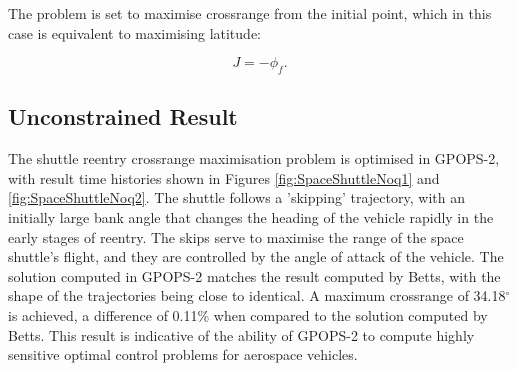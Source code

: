 The problem is set to maximise crossrange from the initial point, which in this case is equivalent to maximising latitude:

\begin{equation}
J = -\phi_f.
\end{equation}

\subsection{Unconstrained Result}
The shuttle reentry crossrange maximisation problem is optimised in GPOPS-2, with result time histories shown in Figures \ref{fig:SpaceShuttleNoq1} and \ref{fig:SpaceShuttleNoq2}. The shuttle follows a 'skipping' trajectory, with an initially large bank angle that changes the heading of the vehicle rapidly in the early stages of reentry. The skips serve to maximise the range of the space shuttle's flight, and they are controlled by the angle of attack of the vehicle. The solution computed in GPOPS-2 matches the result computed by Betts\cite{Betts2009}, with the shape of the trajectories being close to identical. A maximum crossrange of 34.18$^\circ$ is achieved, a difference of 0.11\% when compared to the solution computed by Betts\cite{Betts2009}. This result is indicative of the ability of GPOPS-2 to compute highly sensitive optimal control problems for aerospace vehicles. 


